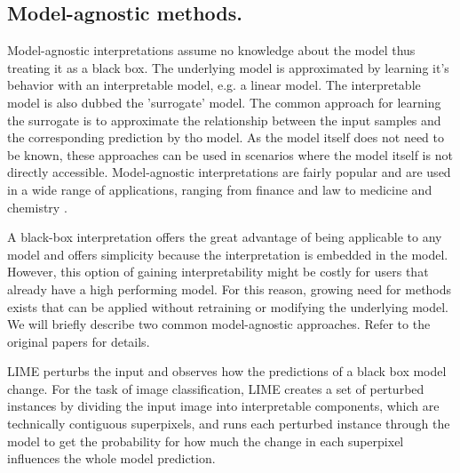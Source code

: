 

\subsection{Model-agnostic methods.}
\label{subsec:bb_methods}

Model-agnostic interpretations assume no knowledge about the model thus treating it as a black box. The underlying model is approximated by learning it's behavior with an interpretable model, e.g. a linear model. The interpretable model is also dubbed the 'surrogate' model. The common approach for learning the surrogate is to approximate the relationship between the input samples and the corresponding prediction by tho model.
As the model itself does not need to be known, these approaches can be used in scenarios where the model itself is not directly accessible. Model-agnostic interpretations are fairly popular and are used in a wide range of applications, ranging from finance and law to medicine and chemistry \cite{elshawi2019interpretability, whitmore2016mapping}. 

A black-box interpretation offers the great advantage of being applicable to any model and offers simplicity because the interpretation is embedded in the model. However, this option of gaining interpretability might be costly for users that already have a high performing model. For this reason, growing need for methods exists that can be applied without retraining or modifying the underlying model.
We will briefly describe two common model-agnostic approaches. Refer to the original papers for details.

\newline
LIME \cite{ribeiro2016should} perturbs the input and observes how the predictions of a black box model change. For the task of image classification, LIME creates a set of perturbed instances by dividing the input image into interpretable components, which are technically contiguous superpixels, and runs each perturbed instance through the model to get the probability for how much the change in each superpixel influences the whole model prediction. 

